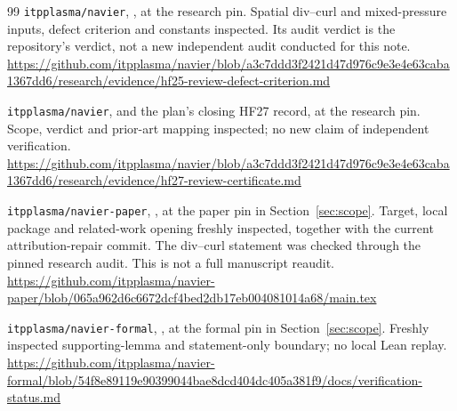 \documentclass[11pt,a4paper]{article}
\theoremstyle{definition}\newtheorem{definition}[theorem]{Definition}
\theoremstyle{remark}\newtheorem{remark}[theorem]{Remark}
\numberwithin{equation}{section}
\begin{document}
\begin{thebibliography}{99}
 \texttt{itpplasma/navier}, , at the research pin. Spatial div--curl and mixed-pressure inputs, defect criterion and constants inspected. Its audit verdict is the repository's verdict, not a new independent audit conducted for this note.\newline
\url{https://github.com/itpplasma/navier/blob/a3c7ddd3f2421d47d976c9e3e4e63caba1367dd6/research/evidence/hf25-review-defect-criterion.md}

 \texttt{itpplasma/navier},  and the plan's closing HF27 record, at the research pin. Scope, verdict and prior-art mapping inspected; no new claim of independent verification.\newline
\url{https://github.com/itpplasma/navier/blob/a3c7ddd3f2421d47d976c9e3e4e63caba1367dd6/research/evidence/hf27-review-certificate.md}

 \texttt{itpplasma/navier-paper}, , at the paper pin in Section~\ref{sec:scope}. Target, local package and related-work opening freshly inspected, together with the current attribution-repair commit. The div--curl statement was checked through the pinned research audit. This is not a full manuscript reaudit.\newline
\url{https://github.com/itpplasma/navier-paper/blob/065a962d6c6672dcf4bed2db17eb004081014a68/main.tex}

 \texttt{itpplasma/navier-formal}, , at the formal pin in Section~\ref{sec:scope}. Freshly inspected supporting-lemma and statement-only boundary; no local Lean replay.\newline
\url{https://github.com/itpplasma/navier-formal/blob/54f8e89119e90399044bae8dcd404dc405a381f9/docs/verification-status.md}
\end{thebibliography}
\end{document}

